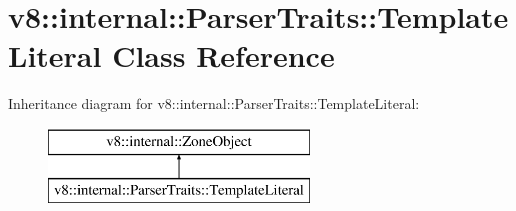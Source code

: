 \hypertarget{classv8_1_1internal_1_1_parser_traits_1_1_template_literal}{}\section{v8\+:\+:internal\+:\+:Parser\+Traits\+:\+:Template\+Literal Class Reference}
\label{classv8_1_1internal_1_1_parser_traits_1_1_template_literal}
Inheritance diagram for v8\+:\+:internal\+:\+:Parser\+Traits\+:\+:Template\+Literal\+:\begin{figure}[H]
\begin{center}
\leavevmode
\includegraphics[height=2.000000cm]{classv8_1_1internal_1_1_parser_traits_1_1_template_literal}
\end{center}
\end{figure}

